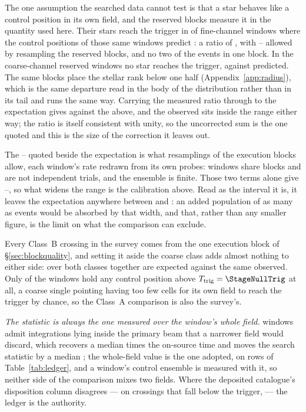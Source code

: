 The one assumption the searched data cannot test is that a star behaves like
a control position in its own field, and the reserved blocks measure it in
the quantity used here. Their stars reach the trigger in \StHoObs{} of
\StHoNFine{} fine-channel windows where the control positions of those same
windows predict \StHoExpFine: a ratio of \StHoRatio, with \StHoLo--\StHoHi{}
allowed by resampling the reserved blocks, and no two of the events in one
block. In the \StHoNCoarse{} coarse-channel reserved windows no star reaches
the trigger, against \StHoExpCoarse{} predicted. The same blocks place the
stellar rank below one half (Appendix~\ref{app:radius}), which is the same
departure read in the body of the distribution rather than in its tail and
runs the same way. Carrying the measured ratio through to the expectation
gives \CeExpX{} against the \CeExp{} above, and the observed \CeObs{} sits
inside the range either way; the ratio is itself consistent with unity, so
the uncorrected sum is the one quoted and this is the size of the correction
it leaves out.

The \CeLo--\CeHi{} quoted beside the expectation is what \CeNBoot{}
resamplings of the execution blocks allow, each window's rate redrawn from
its own \NCtrl{} probes: windows share blocks and are not independent
trials, and the ensemble is finite. Those two terms alone give
\CeLoNull--\CeHiNull, so what widens the range is the calibration above.
Read as the interval it is, it leaves the expectation anywhere between
\CeLo{} and \CeHi: an added population of as many as \CeAddBlind{} events
would be absorbed by that width, and that, rather than any smaller figure,
is the limit on what the comparison can exclude.

Every Class~B crossing in the survey comes from the one execution block of
\S\ref{sec:blockquality}, and setting it aside the coarse class adds almost
nothing to either side: over both classes together \CeExpSurv{} are expected
against the same \CeObs{} observed. Only \NCtrlWinObs{} of the \NWindows{}
windows hold any control position above $T_{\rm trig}=\StageNullTrig$ at
all, a coarse single pointing having too few cells for its own field to
reach the trigger by chance, so the Class~A comparison is also the survey's.

\emph{The statistic is always the one measured over the window's whole field.}
\StNRep{} windows admit integrations lying inside the primary beam that a
narrower field would discard, which recovers a median \StRepOnsrc{} times the
on-source time and moves the search statistic by a median \StRepDT; the
whole-field value is the one adopted, on \StRepAdopted{} rows of
Table~\ref{tab:ledger}, and a window's control ensemble is measured with it,
so neither side of the comparison mixes two fields. Where the deposited
catalogue's disposition column disagrees --- on \StRepFell{} crossings that
fall below the trigger, \StRepAttrClause{} --- the ledger is the authority.


